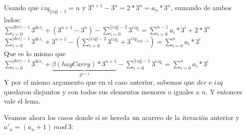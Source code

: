 \begin{itemize}
	Usando que $izq_{|izq|-1} = n$ y $ 3^{n+1} - 3^{n} = 2*3^{n} = a_{n}*3^{n}$, sumando de ambos lados:
	\\

	$\sum_{i=0}^{|der|-1} 3^{der_i} + (3^{n+1} - 3^{n}) - \sum_{i=0}^{|izq|-2} 3^{izq_i} = \sum_{i=0}^{n-1} a_i*3^{i} + 2*3^{n} $
	\\

	$\sum_{i=0}^{|der|-1} 3^{der_i} + 3^{n+1} - (\sum_{i=0}^{|izq|-2} 3^{izq_i} + 3^{izq_{|izq|-1}} ) = \sum_{i=0}^{n} a_i*3^{i}$
	\\

	Que es lo mismo que $\sum_{i=0}^{|der|-1} 3^{der_i} + \underbrace{\beta(hayCarry)*3^{n+1}}_\text{$3^{n+1}$} - \sum_{i=0}^{|izq|-1} 3^{izq_i} = \sum_{i=0}^{n} a_i*3^{i} $
	\\

	Y por el mismo argumento que en el caso anterior, sabemos que $der$ e $izq$ quedaron disjuntos y con todos sus elementos menores o iguales a $n$. Y entonces vale el lema.
	\\
	\end{itemize}

	Veamos ahora los casos donde sí se hereda un acarreo de la iteración anterior y $a'_n = (a_n + 1)\ mod\ 3$:

